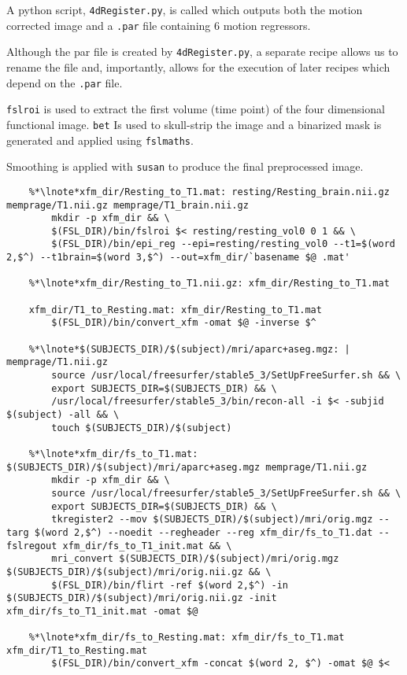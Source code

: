 A python script, \texttt{4dRegister.py}, is called which outputs both the motion corrected image and a \texttt{.par} file containing 6 motion regressors.

Although the par file is created by \texttt{4dRegister.py}, a separate recipe allows us to rename the file and, importantly, allows for the execution of later recipes which depend on the \texttt{.par} file.

\texttt{fslroi} is used to extract the first volume (time point) of the four dimensional functional image. \texttt{bet} Is used to skull-strip the image and a binarized mask is generated and applied using \texttt{fslmaths}.

Smoothing is applied with \texttt{susan} to produce the final preprocessed image.

\begin{lstlisting}
	%*\lnote*xfm_dir/Resting_to_T1.mat: resting/Resting_brain.nii.gz memprage/T1.nii.gz memprage/T1_brain.nii.gz
		mkdir -p xfm_dir && \
		$(FSL_DIR)/bin/fslroi $< resting/resting_vol0 0 1 && \
		$(FSL_DIR)/bin/epi_reg --epi=resting/resting_vol0 --t1=$(word 2,$^) --t1brain=$(word 3,$^) --out=xfm_dir/`basename $@ .mat'
	
	%*\lnote*xfm_dir/Resting_to_T1.nii.gz: xfm_dir/Resting_to_T1.mat
	
	xfm_dir/T1_to_Resting.mat: xfm_dir/Resting_to_T1.mat
		$(FSL_DIR)/bin/convert_xfm -omat $@ -inverse $^
	
	%*\lnote*$(SUBJECTS_DIR)/$(subject)/mri/aparc+aseg.mgz: | memprage/T1.nii.gz
		source /usr/local/freesurfer/stable5_3/SetUpFreeSurfer.sh && \
		export SUBJECTS_DIR=$(SUBJECTS_DIR) && \
		/usr/local/freesurfer/stable5_3/bin/recon-all -i $< -subjid $(subject) -all && \
		touch $(SUBJECTS_DIR)/$(subject)
	
	%*\lnote*xfm_dir/fs_to_T1.mat: $(SUBJECTS_DIR)/$(subject)/mri/aparc+aseg.mgz memprage/T1.nii.gz
		mkdir -p xfm_dir && \
		source /usr/local/freesurfer/stable5_3/SetUpFreeSurfer.sh && \
		export SUBJECTS_DIR=$(SUBJECTS_DIR) && \
		tkregister2 --mov $(SUBJECTS_DIR)/$(subject)/mri/orig.mgz --targ $(word 2,$^) --noedit --regheader --reg xfm_dir/fs_to_T1.dat --fslregout xfm_dir/fs_to_T1_init.mat && \
		mri_convert $(SUBJECTS_DIR)/$(subject)/mri/orig.mgz $(SUBJECTS_DIR)/$(subject)/mri/orig.nii.gz && \
		$(FSL_DIR)/bin/flirt -ref $(word 2,$^) -in $(SUBJECTS_DIR)/$(subject)/mri/orig.nii.gz -init xfm_dir/fs_to_T1_init.mat -omat $@
	
	%*\lnote*xfm_dir/fs_to_Resting.mat: xfm_dir/fs_to_T1.mat xfm_dir/T1_to_Resting.mat
		$(FSL_DIR)/bin/convert_xfm -concat $(word 2, $^) -omat $@ $<
\end{lstlisting}

